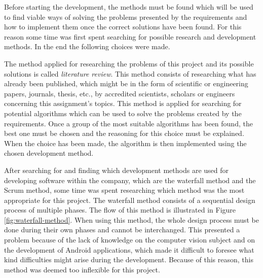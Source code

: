 
Before starting the development, the methods must be found which will be used to find viable ways of solving the problems presented by the requirements and how to implement them once the correct solutions have been found. For this reason some time was first spent searching for possible research and development methods. In the end the following choices were made.


The method applied for researching the problems of this project and its possible solutions is called \emph{literature review}. This method consists of researching what has already been published, which might be in the form of scientific or engineering papers, journals, thesis, etc., by accredited scientists, scholars or engineers concerning this assignment's topics. 
This method is applied for searching for potential algorithms which can be used to solve the problems created by the requirements. Once a group of the most suitable algorithms has been found, the best one must be chosen and the reasoning for this choice must be explained. When the choice has been made, the algorithm is then implemented using the chosen development method.


After searching for and finding which development methods are used for developing software within the company, which are the waterfall method and the Scrum method, some time was spent researching which method was the most appropriate for this project. The waterfall method consists of a sequential design process of multiple phases. The flow of this method is illustrated in Figure \ref{fig:waterfall-method}. When using this method, the whole design process must be done during their own phases and cannot be interchanged. This presented a problem because of the lack of knowledge on the computer vision subject and on the development of Android applications, which made it difficult to foresee what kind difficulties might arise during the development. Because of this reason, this method was deemed too inflexible for this project.

